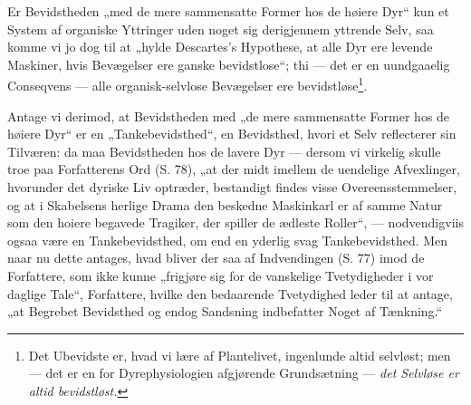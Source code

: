 \documentclass[11pt]{book}
\newcommand{\opage}[1]{\marginnote{\footnotesize\textit{[#1]}}}
\begin{document}
Er Bevidstheden „med de mere sammensatte Former hos de høiere Dyr“ kun
et System af organiske Yttringer uden noget sig derigjennem yttrende
Selv, saa komme vi jo dog
\opage{370} \setcounter{footnote}{0}%
til at „hylde Descartes's Hypothese, at alle Dyr ere levende
Maskiner, hvis Bevægelser ere ganske bevidstlose“; thi --- det
er en uundgaaelig Conseqvens --- alle organisk-selvlose
Bevægelser ere bevidstløse\footnote{Det Ubevidste er, hvad vi lære af
Plantelivet, ingenlunde altid selvløst; men --- det er en for
Dyrephysiologien afgjørende Grundsætning --- \emph{det Selvløse er altid
bevidstløst.}}.

Antage vi derimod, at Bevidstheden med „de mere sammensatte Former
hos de høiere Dyr“ er en „Tankebevidsthed“, en Bevidsthed, hvori et
Selv reflecterer sin Tilværen: da maa Bevidstheden hos de lavere Dyr
--- dersom vi virkelig skulle troe paa Forfatterens Ord (S. 78), „at
der midt imellem de uendelige Afvexlinger, hvorunder det dyriske Liv
optræder, bestandigt findes visse Overeensstemmelser, og at i
Skabelsens herlige Drama den beskedne Maskinkarl er af samme Natur
som den hoiere begavede Tragiker, der spiller de ædleste Roller“,
--- nodvendigviis ogsaa være en Tankebevidsthed, om end en yderlig
svag Tankebevidsthed. Men naar nu dette antages, hvad bliver der saa
af Indvendingen (S. 77) imod de Forfattere, som ikke kunne „frigjøre
sig for de vanskelige Tvetydigheder i vor daglige Tale“, Forfattere,
hvilke den bedaarende Tvetydighed leder til at antage, „at Begrebet
Bevidsthed og endog Sandsning indbefatter Noget af Tænkning.“
\end{document}
